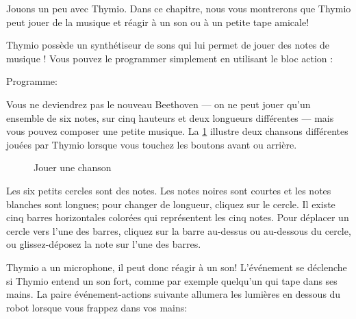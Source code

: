\label{ch.bells}

Jouons un peu avec Thymio.
Dans ce chapitre, nous vous montrerons que Thymio peut jouer de la musique et réagir à un son ou à un petite tape amicale!


Thymio possède un synthétiseur de sons qui lui permet de jouer des notes de musique !
Vous pouvez le programmer simplement en utilisant le bloc action :

{\raggedleft \hfill Programme: }

Vous ne deviendrez pas le nouveau Beethoven --- on ne peut jouer qu'un ensemble de six notes, sur cinq hauteurs et deux longueurs différentes --- mais vous pouvez composer une petite musique.
La \cref{fig.music} illustre deux chansons différentes jouées par Thymio lorsque vous touchez les boutons avant ou arrière.

\begin{figure}
\begin{center}
\caption{Jouer une chanson}\label{fig.music}
\end{center}
\end{figure}

Les six petits cercles sont des notes.
Les notes noires sont courtes et les notes blanches sont
longues; pour changer de longueur, cliquez sur le cercle.
Il existe cinq barres horizontales colorées qui représentent
les cinq notes.
Pour déplacer un cercle vers l'une des barres,
cliquez sur la barre au-dessus ou au-dessous du cercle,
ou glissez-déposez la note sur l'une des barres.




Thymio a un microphone, il peut donc réagir à un son! L'événement  se déclenche si Thymio entend un son fort, comme par exemple quelqu'un qui tape dans ses mains.
La paire événement-actions suivante allumera les lumières en dessous du robot lorsque vous frappez dans vos mains: 

\bigskip

